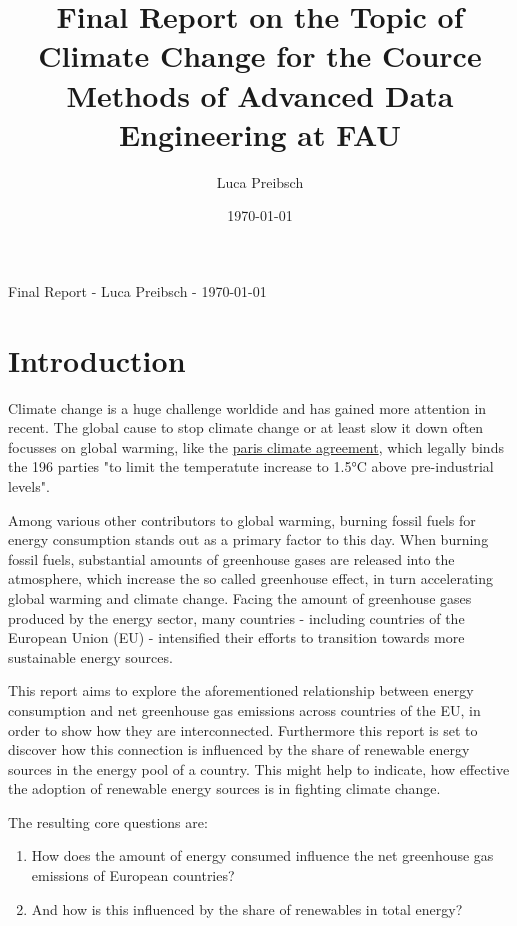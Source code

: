 \documentclass{article}
\begin{document}
\title{Final Report on the Topic of Climate Change
for the Cource Methods of Advanced Data Engineering at FAU}
\author{Luca Preibsch}
\date{\today}

\begin{center}
Final Report - Luca Preibsch - \today
\end{center}


\section*{Introduction}
Climate change is a huge challenge worldide and has gained more attention in recent.
The global cause to stop climate change or at least slow it down often focusses on global warming, like the
\href{https://unfccc.int/process-and-meetings/the-paris-agreement}{paris climate agreement},
which legally binds the 196 parties "to limit the temperatute increase to 1.5°C above pre-industrial levels".

Among various other contributors to global warming, burning fossil fuels for energy consumption stands out as
a primary factor to this day.
When burning fossil fuels, substantial amounts of greenhouse gases are released into the atmosphere,
which increase the so called greenhouse effect, in turn accelerating global warming and climate change.
Facing the amount of greenhouse gases produced by the energy sector, many countries - including countries of
the European Union (EU) - intensified their efforts to transition towards more sustainable energy sources.

This report aims to explore the aforementioned relationship between energy consumption and net greenhouse gas
emissions across countries of the EU, in order to show how they are interconnected.
Furthermore this report is set to discover how this connection is influenced by the share of renewable energy sources
in the energy pool of a country. This might help to indicate, how effective the adoption of renewable energy sources is
in fighting climate change.

The resulting core questions are:
\begin{enumerate}
    \item How does the amount of energy consumed influence the net greenhouse gas emissions of European countries?
    \item And how is this influenced by the share of renewables in total energy?
\end{enumerate}
\end{document}
